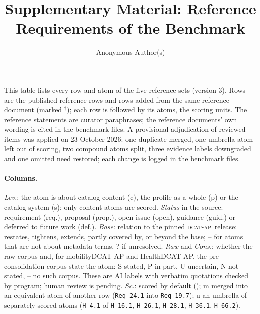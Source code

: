 \documentclass{llncs}
\title{Supplementary Material: Reference Requirements of the Benchmark}
\author{Anonymous Author(s)}
\institute{Anonymous Institution}
\newcommand{\dcatap}{\textsc{dcat-ap}}
\newcommand{\req}[1]{\texttt{#1}}
\begin{document}
\maketitle

This table lists every row and atom of the five reference sets (version 3). Rows are the published reference rows and rows added from the same reference document (marked $^{\dagger}$); each row is followed by its atoms, the scoring units. The reference statements are curator paraphrases; the reference documents' own wording is cited in the benchmark files. A provisional adjudication of reviewed items was applied on 23 October 2026: one duplicate merged, one umbrella atom left out of scoring, two compound atoms split, three evidence labels downgraded and one omitted need restored; each change is logged in the benchmark files.

\paragraph{Columns.} \emph{Lev.}: the atom is about catalog content (c), the profile as a whole (p) or the catalog system (s); only content atoms are scored. \emph{Status} in the source: requirement (req.), proposal (prop.), open issue (open), guidance (guid.) or deferred to future work (def.). \emph{Base}: relation to the pinned \dcatap\ release: restates, tightens, extends, partly covered by, or beyond the base; -- for atoms that are not about metadata terms, ? if unresolved. \emph{Raw} and \emph{Cons.}: whether the raw corpus and, for mobilityDCAT-AP and HealthDCAT-AP, the pre-consolidation corpus state the atom: S stated, P in part, U uncertain, N not stated, -- no such corpus. These are AI labels with verbatim quotations checked by program; human review is pending. \emph{Sc.}: scored by default (\checkmark); m merged into an equivalent atom of another row (\req{Req-24.1} into \req{Req-19.7}); u an umbrella of separately scored atoms (\req{H-4.1} of \req{H-16.1}, \req{H-26.1}, \req{H-28.1}, \req{H-36.1}, \req{H-66.2}).
\end{document}
